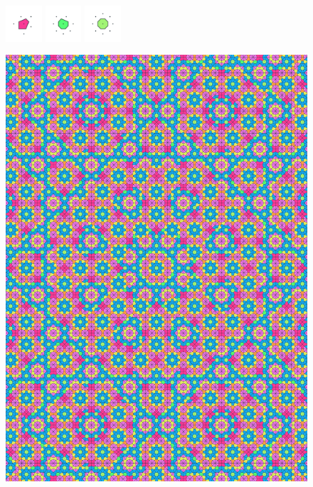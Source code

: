 \documentclass[text.tex]{subfiles}
\begin{document}
\begin{figure}[h!]
\includegraphics[width=0.12\textwidth]{img/results/circle8/circle8_160022_(5267_-2181alpha_1)_005.pdf}
\includegraphics[width=0.12\textwidth]{img/results/circle8/circle8_160022_(5267_-2181alpha_1)_006.pdf}
\includegraphics[width=0.12\textwidth]{img/results/circle8/circle8_160022_(5267_-2181alpha_1)_007.pdf}
\end{figure}

\begin{figure}[h!]
\centering
\includegraphics[width=1\textwidth]{img/results/circle8/quasi_circle_160022_(5267_-2181alpha_1).pdf}
\end{figure}
\end{document}
